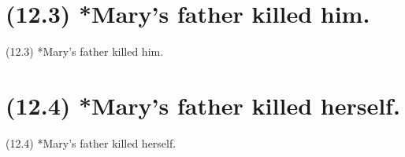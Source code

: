 \documentclass{article}
\begin{document}
\clearpage

%
%

\section*{(12.3) *Mary's father killed him.}

\bigbreak
\begin{enumerate*}
\item[(12.3)] *Mary's father killed him.
\end{enumerate*}
\bigbreak

\bigbreak
\begin{minipage}{\textwidth}
\end{minipage}
\bigbreak

\clearpage

%
%

\section*{(12.4) *Mary's father killed herself.}

\bigbreak
\begin{enumerate*}
\item[(12.4)] *Mary's father killed herself.
\end{enumerate*}
\bigbreak

\bigbreak
\begin{minipage}{\textwidth}
\end{minipage}
\bigbreak
\end{document}
